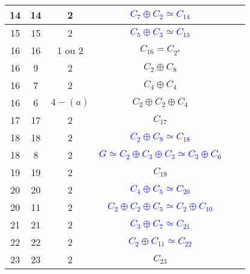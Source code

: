 \documentclass[12pt, openany]{report}
\begin{document}
\begin{tabular}{|c||c|c|c|c|c|}
\hline  14 & 14 & 2 & \textcolor{blue}{$C_{7}\oplus C_{2} \simeq C_{14}$} \\
\hline  15 & 15 & 2 & \textcolor{blue}{$C_{5}\oplus C_{3} \simeq C_{15}$} \\
\hline  16  & 16 & 1 ou 2 & $C_{16}=C_{2^{4}}$  \\
\hline  16 & 9 & 2 & $C_{2} \oplus C_{8} $ \\
\hline  16  & 7 & 2 & $C_{4}\oplus C_{4}$  \\  
\hline  16  & 6 & $4-(a)$ & $C_{2} \oplus C_{2} \oplus C_{4}$ \\
\hline  17  & 17 & 2 & $C_{17}$  \\
\hline  18  & 18 & 2 & \textcolor{blue}{$C_{2} \oplus C_{9} \simeq C_{18}$} \\
\hline 18 & 8 & 2 & \textcolor {blue}{$G \simeq C_{2}\oplus C_{3}\oplus C_{3} \simeq C_{3}\oplus C_{6}$} \\
\hline  19  & 19 & 2 & $C_{19}$\\  
\hline  20  & 20 & 2 & \textcolor{blue}{$C_{4}\oplus C_{5} \simeq C_{20}$}  \\
\hline  20  & 11 & 2 & \textcolor{blue}{$C_{2}\oplus C_{2}\oplus C_{5} \simeq C_{2}\oplus C_{10}$}  \\
\hline  21  & 21 & 2 & \textcolor{blue}{$C_{3}\oplus C_{7} \simeq C_{21}$} \\
\hline  22  & 22 & 2 & \textcolor{blue}{$C_{2}\oplus C_{11} \simeq C_{22}$} \\                               
\hline  23  & 23 & 2 & $C_{23}$ \\

\end{tabular}
\end{document}
